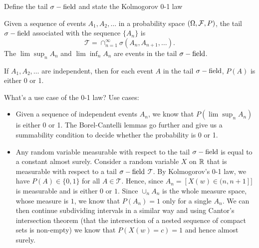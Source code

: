 \documentclass[avery5388,grid,frame]{flashcards}
\begin{document}
\begin{flashcard}
    {Define the tail $\sigma-\text{field}$ and state the Kolmogorov 0-1 law}
    \begin{definition}
        Given a sequence of events $A_1, A_2, \dots$ in a probability space $(\Omega, \mathcal F, P)$, the tail $\sigma-\text{field}$ associated with the sequence $\{ A_n \}$ is
        $$\mathcal T = \cap_{n=1}^\infty \sigma(A_n, A_{n+1}, \dots).$$
        The $\lim \sup_n A_n$ and $\lim \inf_n A_n$ are events in the tail $\sigma-\text{field}$.
    \end{definition}

    \begin{theorem}
        If $A_1, A_2, \dots$ are independent, then for each event $A$ in the tail $\sigma-\text{field}$, $P(A)$ is either 0 or 1.
    \end{theorem}

\end{flashcard}


\begin{flashcard}
    {What's a use case of the 0-1 law?}
    Use cases:
    \begin{itemize}
        \item Given a sequence of independent events $A_n$, we know that $P(\lim \sup_n A_n)$ is either 0 or 1. The Borel-Cantelli lemmas go further and give us a summability condition to decide whether the probability is 0 or 1.
        \item Any random variable measurable with respect to the tail $\sigma-\text{field}$ is equal to a constant almost surely. Consider a random variable $X$ on $\mathbb{R}$ that is measurable with respect to a tail $\sigma-\text{field}$ $\mathcal T$. By Kolmogorov's 0-1 law, we have $P(A) \in \{ 0, 1\}$ for all $A \in \mathcal T$. Hence, since $A_n = [X(w) \in (n,n+1] ]$ is measurable and is either $0$ or $1$. Since $\cup_n A_n$ is the whole measure space, whose measure is $1$, we know that $P(A_n) = 1$ only for a single $A_n$. We can then continue subdividing intervals in a similar way and using Cantor's intersection theorem (that the intersection of a nested sequence of compact sets is non-empty) we know that $P(X(w) = c) = 1$ and hence almost surely.
    \end{itemize}
\end{flashcard}
\end{document}
